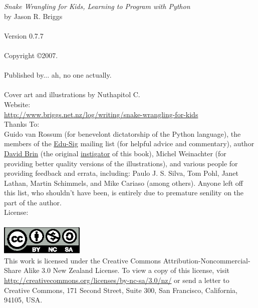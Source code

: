 \noindent
\textsf{\emph{Snake Wrangling for Kids, Learning to Program with Python}}\\
by Jason R. Briggs\\
\\
Version 0.7.7
\\\\
Copyright \copyright 2007.\\
\\
Published by... ah, no one actually.\\
\\
Cover art and illustrations by Nuthapitol C.\\
\linebreak 
\noindent
Website:\\ \href{http://www.briggs.net.nz/log/writing/snake-wrangling-for-kids}{http://www.briggs.net.nz/log/writing/snake-wrangling-for-kids}\\ 

\noindent
Thanks To:\\
Guido van Rossum (for benevelont dictatorship of the Python language), the members of the \href{http://www.python.org/community/sigs/current/edu-sig/}{Edu-Sig} mailing list (for helpful advice and commentary), author \href{http://www.davidbrin.com/}{David Brin} (the original \href{http://www.salon.com/tech/feature/2006/09/14/basic/}{instigator} of this book), Michel Weinachter (for providing better quality versions of the illustrations), and various people for providing feedback and errata, including: Paulo J. S. Silva, Tom Pohl, Janet Lathan, Martin Schimmels, and Mike Cariaso (among others).  Anyone left off this list, who shouldn't have been, is entirely due to premature senility on the part of the author.\\

\noindent
License:\\
\\
\includegraphics[width=40mm]{eps/by-nc-sa.eps}\\
This work is licensed under the Creative Commons Attribution-Noncommercial-Share Alike 3.0 New Zealand License. To view a copy of this license, visit\\ \href{http://creativecommons.org/licenses/by-nc-sa/3.0/nz/}{http://creativecommons.org/licenses/by-nc-sa/3.0/nz/} or send a letter to Creative Commons, 171 Second Street, Suite 300, San Francisco, California, 94105, USA.\\

